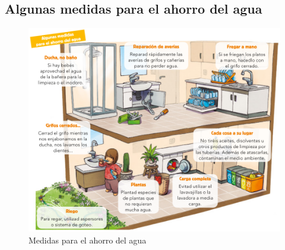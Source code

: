\subsection{Algunas medidas para el ahorro del agua}

\begin{figure}[!ht]
    \centering
    \includegraphics[width=1\linewidth]{Tema2/11_Medidas_ahorro_agua.png}
    \caption{Medidas para el ahorro del agua}
    \label{fig:medidas-ahorro-agua}
\end{figure}